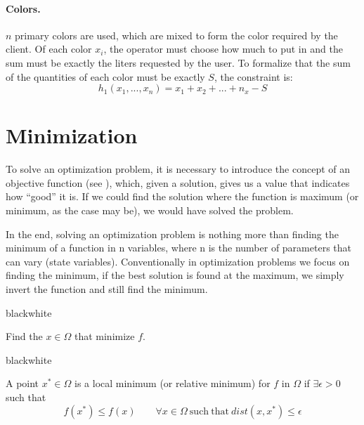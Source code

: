 \paragraph{Colors.} \( n \) primary colors are used, which are mixed to form the color required by the client. Of each color \( x_i \), the operator must choose how much to put in and the sum must be exactly the liters requested by the user. To formalize that the sum of the quantities of each color must be exactly \( S \), the constraint is:
\[ h_1(x_1, ..., x_n) = x_1 + x_2 + ... + n_x - S \]



\section{Minimization}
\label{sec:op.minimization}

To solve an optimization problem, it is necessary to introduce the concept of an objective function (see ), which, given a solution, gives us a value that indicates how ``good'' it is. If we could find the solution where the function is maximum (or minimum, as the case may be), we would have solved the problem. 

In the end, solving an optimization problem is nothing more than finding the minimum of a function in n variables, where n is the number of parameters that can vary (state variables).
Conventionally in optimization problems we focus on finding the minimum, if the best solution is found at the maximum, we simply invert the function and still find the minimum.

\begin{remark}{black}{white}
    \begin{definition}
        Find the \( x \in \Omega \) that minimize \( f \).
    \end{definition}
\end{remark}

\begin{remark}{black}{white}
    \begin{definition}
        A point \( x^* \in \Omega \) is a local minimum (or relative minimum) for \( f \) in \( \Omega \) if \( \exists \epsilon > 0 \) such that
        \[
            f(x^*) \leq f(x) \qquad \forall x \in \Omega \mathrm{~such~that~} \mathit{dist}(x, x^*) \leq \epsilon
        \]
    \end{definition}
\end{remark}

